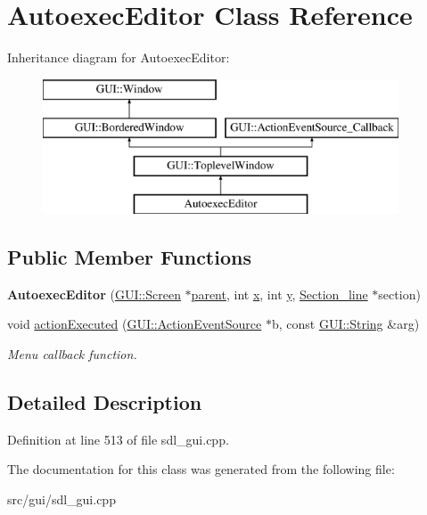 \hypertarget{classAutoexecEditor}{\section{Autoexec\-Editor Class Reference}
\label{classAutoexecEditor}
}
Inheritance diagram for Autoexec\-Editor\-:\begin{figure}[H]
\begin{center}
\leavevmode
\includegraphics[height=4.000000cm]{classAutoexecEditor}
\end{center}
\end{figure}
\subsection*{Public Member Functions}
\begin{DoxyCompactItemize}
\item 
\hypertarget{classAutoexecEditor_ae2c55e6e3715432d9c394f1dec2f4255}{{\bfseries Autoexec\-Editor} (\hyperlink{classGUI_1_1Screen}{G\-U\-I\-::\-Screen} $\ast$\hyperlink{classGUI_1_1Window_a2e593ff65e7702178d82fe9010a0b539}{parent}, int \hyperlink{classGUI_1_1Window_a6ca6a80ca00c9e1d8ceea8d3d99a657d}{x}, int \hyperlink{classGUI_1_1Window_a0ee8e923aff2c3661fc2e17656d37adf}{y}, \hyperlink{classSection__line}{Section\-\_\-line} $\ast$section)}\label{classAutoexecEditor_ae2c55e6e3715432d9c394f1dec2f4255}

\item 
\hypertarget{classAutoexecEditor_a5103a2bb5e750230a808ce091448ed05}{void \hyperlink{classAutoexecEditor_a5103a2bb5e750230a808ce091448ed05}{action\-Executed} (\hyperlink{classGUI_1_1ActionEventSource}{G\-U\-I\-::\-Action\-Event\-Source} $\ast$b, const \hyperlink{classGUI_1_1String}{G\-U\-I\-::\-String} \&arg)}\label{classAutoexecEditor_a5103a2bb5e750230a808ce091448ed05}

\begin{DoxyCompactList}\small\item\em Menu callback function. \end{DoxyCompactList}\end{DoxyCompactItemize}


\subsection{Detailed Description}


Definition at line 513 of file sdl\-\_\-gui.\-cpp.



The documentation for this class was generated from the following file\-:\begin{DoxyCompactItemize}
\item 
src/gui/sdl\-\_\-gui.\-cpp\end{DoxyCompactItemize}
